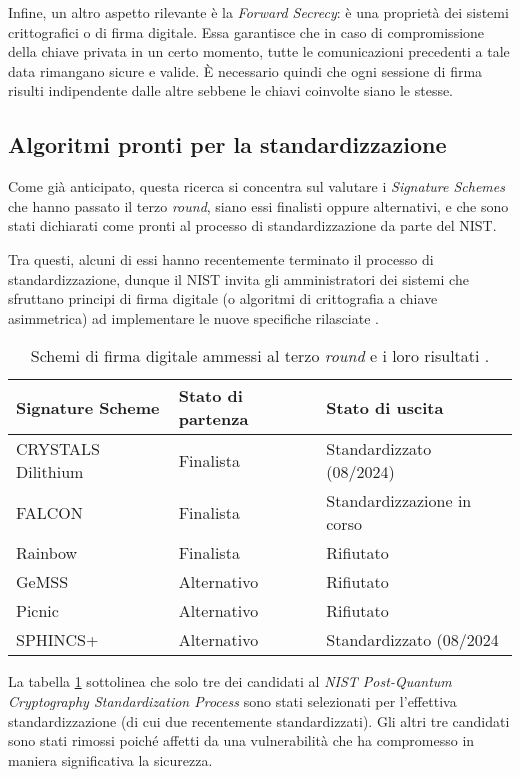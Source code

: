 Infine, un altro aspetto rilevante è la \textit{Forward Secrecy}: è una proprietà dei sistemi crittografici o di firma digitale. Essa garantisce che in caso di compromissione della chiave privata in un certo momento, tutte le comunicazioni precedenti a tale data rimangano sicure e valide. È necessario quindi che ogni sessione di firma risulti indipendente dalle altre sebbene le chiavi coinvolte siano le stesse.

\subsection{Algoritmi pronti per la standardizzazione}
Come già anticipato, questa ricerca si concentra sul valutare i \textit{Signature Schemes} che hanno passato il terzo \textit{round}, siano essi finalisti oppure alternativi, e che sono stati dichiarati come pronti al processo di standardizzazione da parte del NIST.

Tra questi, alcuni di essi hanno recentemente terminato il processo di standardizzazione, dunque il NIST invita gli amministratori dei sistemi che sfruttano principi di firma digitale (o algoritmi di crittografia a chiave asimmetrica) ad implementare le nuove specifiche rilasciate \cite{nist2024article}.

\begin{table}[H]
\centering
\begin{tabular}{ | m{10em} | m{9em}| m{14em} | }
\hline
\textbf{Signature Scheme} & \textbf{Stato di partenza} & \textbf{Stato di uscita}\\ \hline
CRYSTALS Dilithium & Finalista & Standardizzato (08/2024) \\ \hline
FALCON & Finalista & Standardizzazione in corso \\ \hline
Rainbow & Finalista & Rifiutato \\ \hline
GeMSS & Alternativo & Rifiutato \\ \hline
Picnic & Alternativo & Rifiutato \\ \hline
SPHINCS+ & Alternativo & Standardizzato (08/2024 \\ \hline
\end{tabular}
\caption{Schemi di firma digitale ammessi al terzo \textit{round} e i loro risultati \cite{NISTthirdReport}.}
\label{tab:ThirdRoundFinalists}
\end{table}

La tabella \ref{tab:ThirdRoundFinalists} sottolinea che solo tre dei candidati al \textit{NIST Post-Quantum Cryptography Standardization Process} \cite{nist-pqc} sono stati selezionati per l'effettiva standardizzazione (di cui due recentemente standardizzati). Gli altri tre candidati sono stati rimossi poiché affetti da una vulnerabilità che ha compromesso in maniera significativa la sicurezza.

